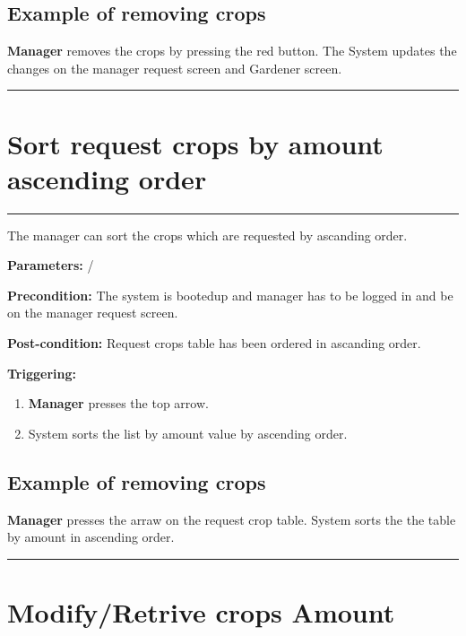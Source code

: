 \subsection{Example of removing crops}
\textbf{Manager} removes the crops by pressing the red button. The System
updates the changes on the manager request screen and Gardener screen.
\hfill
\vspace{0.5cm}
\hrule


\section{Sort request crops by amount ascending order}

\hrule
\hfill
\vspace{0.5cm}

\label{operation:sortCropsRequest}

The manager can sort the crops which are requested by ascanding order.
\begin{description}

\item \textbf{Parameters:} /
\item \textbf{Precondition:} The system is bootedup and manager has to be
logged in and be on the manager request screen.
\item \textbf{Post-condition:} Request crops table has been ordered in ascanding
order.

\item \textbf{Triggering:}
\begin{enumerate}
\item \textbf{Manager} presses the top arrow.
\item System sorts the list by amount value by ascending order.
\end{enumerate}
\end{description}

\subsection{Example of removing crops}
\textbf{Manager} presses the arraw on the request crop table. System sorts the
the table by amount in ascending order.

\hfill
\vspace{0.5cm}
\hrule

\break

\section{Modify/Retrive crops Amount}

